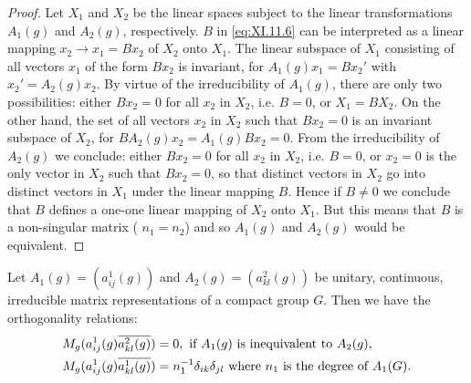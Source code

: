\begin{proof}
 Let $X_{1}$ and $X_{2}$ be the linear spaces subject to the linear transformations $A_{1}(g)$ and $A_{2}(g)$, respectively. $B$ in \eqref{eq:XI.11.6} can be interpreted as a linear mapping $x_{2} \to x_{1} = Bx_{2}$ of $X_{2}$ onto $X_{1}$. The linear subspace of $X_{1}$ consisting of all vectors $x_{1}$ of the form $Bx_{2}$ is invariant, for $A_{1}(g)x_{1} = Bx_{2}'$ with $x_{2}' = A_{2}(g)x_{2}$. By virtue of the irreducibility of $A_{1}(g)$, there are only two possibilities: either $Bx_{2} = 0$ for all $x_{2}$ in $X_{2}$, i.e. $B = 0$, or $X_{1} = BX_{2}$. On the other hand, the set of all vectors $x_{2}$ in $X_{2}$ such that $Bx_{2} = 0$ is an invariant subspace of $X_{2}$, for $BA_{2}(g)x_{2} = A_{1}(g)Bx_{2} = 0$. From the irreducibility of $A_{2}(g)$ we conclude: either $Bx_{2} = 0$ for all $x_{2}$ in $X_{2}$, i.e. $B = 0$, or $x_{2} = 0$ is the only vector in $X_{2}$ such that $Bx_{2} = 0$, so that distinct vectors in $X_{2}$ go into distinct vectors in $X_{1}$ under the linear mapping $B$. Hence if $B \neq 0$ we conclude that $B$ defines a one-one linear mapping of $X_{2}$ onto $X_{1}$. But this means that $B$ is a non-singular matrix ( $n_1 = n_2$) and so $A_{1}(g)$ and $A_{2}(g)$ would be equivalent. 
\end{proof}

\begin{proposition}\label{prop:XI.11.Proposition.3} Let $A_{1}(g) = (a_{ij}^{1}(g))$ and $A_{2}(g) = (a_{kl}^{2}(g))$ be unitary, continuous, irreducible matrix representations of a compact group $G$. Then we have the orthogonality relations: 
\begin{align}
M _{g} (a _{ij} ^{1} (g) \overline {{a _{kl} ^{2} (g)}})& = 0, \text{ if } A _{1} (g) \text{ is inequivalent to } A _{2} (g), \label{eq:XI.11.7} \\
M _{g} (a _{ij} ^{1} (g) \overline {{a _{kl} ^{1} (g)}})& = n _{1} ^{-1} \delta_{ik} \delta_{jl} \text{ where } n _{1} \text{ is the degree of } A _{1} (G). \notag
\end{align}
\end{proposition}

